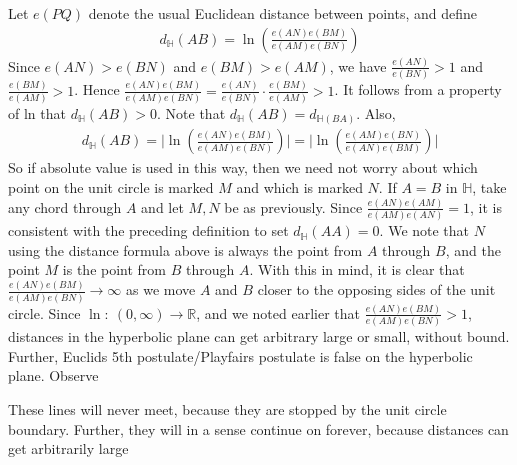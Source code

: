 \documentclass{report}
\begin{document}
\begin{itemize}
\begin{figure}[ht]
                \centering
                \label{fig:hyper}
            \end{figure}
            \bigbreak \noindent 
            Let $e(PQ)$ denote the usual Euclidean distance between points, and define
            \begin{align*}
                d_{\mathbb{H}}(AB) = \ln{\left(\frac{e(AN)e(BM)}{e(AM)e(BN)}\right)}
            \end{align*}
            Since $e(AN)>e(BN)$ and $e(BM) > e(AM)$, we have $\frac{e(AN)}{e(BN)} > 1$ and $\frac{e(BM)}{e(AM)} > 1$. Hence $\frac{e(AN)e(BM)}{e(AM)e(BN)}  = \frac{e(AN)}{e(BN)} \cdot \frac{e(BM)}{e(AM)}> 1$. It follows from a property of ln that $d_{\mathbb{H}}(AB) > 0$. Note that $d_{\mathbb{H}}(AB) = d_{\mathbb{H}(BA)}$. Also,
            \begin{align*}
                d_{\mathbb{H}}(AB) = \bigg\lvert \ln{\left(\frac{e(AN)e(BM)}{e(AM)e(BN)}\right)} \bigg\rvert = \bigg\lvert \ln{\left(\frac{e(AM)e(BN)}{e(AN)e(BM)}\right)} \bigg\rvert
            \end{align*}
            So if absolute value is used in this way, then we need not worry about which point on the unit circle is marked $M$ and which is marked $N$.
            \bigbreak \noindent 
            If $A=B$ in $\mathbb{H}$, take any chord through $A$ and let $M,N$ be as previously. Since $\frac{e(AN)e(AM)}{e(AM)e(AN)} =1$, it is consistent with the preceding definition to set $d_{\mathbb{H}}(AA) = 0$.
            \bigbreak \noindent 
            We note that $N$ using the distance formula above is always the point from $A$ through $B$, and the point $M$ is the point from $B$ through $A$. With this in mind, it is clear that $\frac{e(AN)e(BM)}{e(AM)e(BN)} \to \infty$ as we move $A$ and $B$ closer to the opposing sides of the unit circle. Since $\ln:\ (0,\infty) \to \mathbb{R}$, and we noted earlier that $\frac{e(AN)e(BM)}{e(AM)e(BN)} > 1$, distances in the hyperbolic plane can get arbitrary large or small, without bound.
            \bigbreak \noindent 
            Further, Euclids 5th postulate/Playfairs postulate is  false on the hyperbolic plane. Observe
            \bigbreak \noindent 
            \begin{figure}[ht]
                \centering
                \label{fig:e5}
            \end{figure}
            \bigbreak \noindent 
            These lines will never meet, because they are stopped by the unit circle boundary. Further, they will in a sense continue on forever, because distances can get arbitrarily large

\end{itemize}
\end{document}

